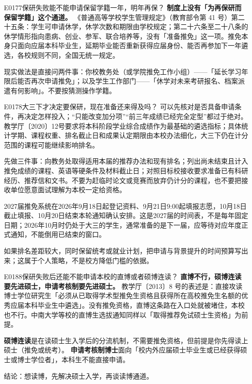 \begin{qa}{E0177}{保研失败能不能申请保留学籍一年，明年再保？}
\textbf{制度上没有「为再保研而保留学籍」这个通道。}
《普通高等学校学生管理规定》（教育部令第 41 号）第二十五条：学生可申请休学，休学次数和期限由学校规定；第二十六条至二十八条的休学情形指向患病、创业、参军、联合培养等，没有「准备推免」这一项。推免本身只面向应届本科毕业生，延期毕业能否重新获得应届身份、能否再参加下一年遴选，各校规则不同，全国无统一规定。

现实做法是直接问两件事：你校教务处（或学院推免工作小组）——「延长学习年限后能否再次申请推免」；以及学生工作部门——「休学对未来考研报名、档案派遣有何影响」。不要按猜测操作学籍。
\end{qa}

\begin{qa}{E0178}{大三下才决定要保研，现在准备还来得及吗？}
可以先核对是否具备申请条件，再决定怎样投入；“只能改变加分项”“前三年成绩已经完全定型”都过于绝对。教学厅〔2020〕12号要求将本科阶段学业综合成绩作为最基础的遴选指标；具体统计学期、课程权重、排名截止日和成果认定期限由本校办法细化，大三下仍在计分范围的课程可能继续影响排名。 

先做三件事：向教务处取得适用本届的推荐办法和现有排名；列出尚未结束且计入推免成绩的课程、英语等硬条件及材料截止日；对照目标校接收要求准备已有科研经历、推荐信和文书。不要为赶临时论文或竞赛而放弃仍计分的课程，也不要把接收单位愿意面试理解为本校一定给资格。

2027届推免系统在2026年9月18日起登记资料、9月21日9:00起填报志愿，10月18日截止填报、10月20日结束本轮通知确认安排。这是2027届的时间表，不是每年固定日期；2026年10月时仍处于大三的学生，通常准备的是下一届，应等待对应年度正式通知，不能倒用已结束的窗口。

如果排名差距较大，同时保留统考或就业计划，把申请与背景提升的时间预算写出来；这属于个人策略，不是校方降低门槛的依据。
\end{qa}

\begin{qa}{E0188}{保研失败后还能不能申请本校的直博或者硕博连读？}
\textbf{直博不行，硕博连读要先进硕士，申请考核制要先进硕士。}
教学厅〔2013〕8 号的表述是：直接攻读博士学位研究生「必须从已取得学术型推免生资格且获得所在高校推免生名额的优秀应届本科毕业生中遴选」。没有推免资格，直博这条路在入口处就被堵住，本校也不行。中南大学等校的直博生选拔通知同样以「取得推荐免试硕士生资格」为前提。

\textbf{硕博连读}是在读硕士生入学后的分流机制，不需要推免资格，但前提是你先得读上硕士（推免或统考）。
\textbf{申请考核制博士}面向「校内外应届硕士毕业生或已经获得硕士或博士学位者」，本科生不能直接申请。

结论：想读博，先解决硕士入学，再谈读博通道。
\end{qa}

